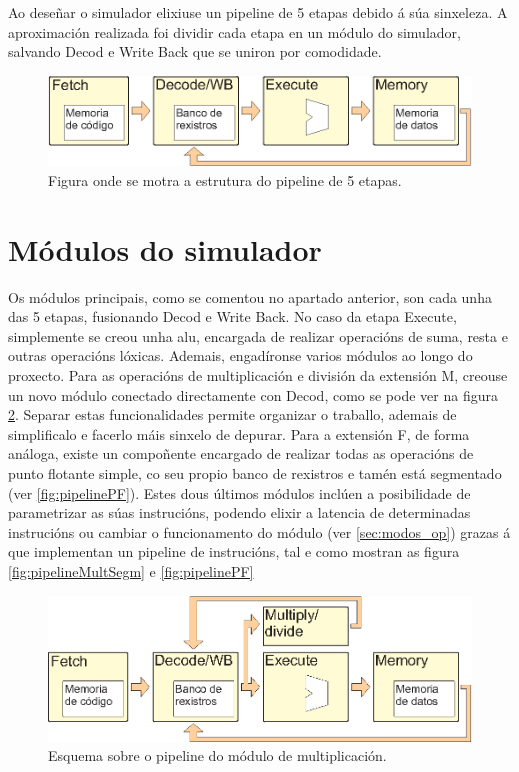 Ao deseñar o simulador elixiuse un pipeline de 5 etapas debido á súa sinxeleza. A aproximación realizada foi dividir cada etapa en un módulo do simulador, salvando Decod e Write Back que se uniron por comodidade.

\begin{figure}[hp!]
  \centering
  \includegraphics[width=\textwidth]{imaxes/pipeline5etapas.EPS}
  \caption{Figura onde se motra a estrutura do pipeline de 5 etapas.}
  \label{fig:pipeline5etapas}
\end{figure}

\section{Módulos do simulador}\label{sec:modulo_sim}
Os módulos principais, como se comentou no apartado anterior, son cada unha das 5 etapas, fusionando Decod e Write Back. No caso da etapa Execute, simplemente se creou unha \acrshort{alu}, encargada de realizar operacións de suma, resta e outras operacións lóxicas. Ademais, engadíronse varios módulos ao longo do proxecto. Para as operacións de multiplicación e división da extensión M, creouse un novo módulo conectado directamente con Decod, como se pode ver na figura \ref{fig:pipelineMult}. Separar estas funcionalidades permite organizar o traballo, ademais de simplificalo e facerlo máis sinxelo de depurar. Para a extensión F, de forma análoga, existe un compoñente encargado de realizar todas as operacións de punto flotante simple, co seu propio banco de rexistros e tamén está segmentado (ver \ref{fig:pipelinePF}). Estes dous últimos módulos inclúen a posibilidade de parametrizar as súas instrucións, podendo elixir a latencia de determinadas instrucións ou cambiar o funcionamento do módulo (ver \ref{sec:modos_op}) grazas á que implementan un pipeline de instrucións, tal e como mostran as figura \ref{fig:pipelineMultSegm} e \ref{fig:pipelinePF}

\begin{figure}[hp!]
  \centering
  \includegraphics[width=\textwidth]{imaxes/pipelineMult.EPS}
  \caption{Esquema sobre o pipeline do módulo de multiplicación.}
  \label{fig:pipelineMult}
\end{figure}


